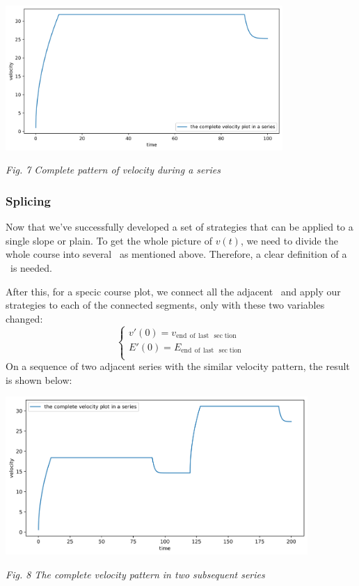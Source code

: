 \documentclass{article}
\begin{document}
\begin{itemize}
\begin{itemize}
							\begin{center}
								\includegraphics[height=5.5cm]{complete velocity pattern.png}

								\small\textit{Fig. 7 Complete pattern of velocity during a series}
							\end{center}

					\end{itemize}

			\end{itemize}
		\subsubsection{Splicing}
			Now that we've successfully developed a set of strategies that can be applied to a single slope or plain. To get the whole picture of \(v(t)\), we need to divide the whole course into several  \ as mentioned above. Therefore, a clear definition of a \ is needed.

			After this, for a specic course plot, we connect all the adjacent  \ and apply our strategies to each of the connected segments, only with these two variables changed:
			$$
			\left\{ \begin{array}{c}
				v\prime\left( 0 \right) =v_{\mathrm{end}\:\:\mathrm{of}\:\:\mathrm{last}\:\:\sec\mathrm{tion}}\\
				E\prime\left( 0 \right) =E_{\mathrm{end}\:\:\mathrm{of}\:\:\mathrm{last}\:\:\sec\mathrm{tion}}\\
			\end{array} \right.
			$$
			On a sequence of two adjacent series with the similar velocity pattern, the result is shown below:
			\begin{center}
				\includegraphics[height=6cm]{the complete velocity pattern in two adjacent series.png}

				\small\textit{Fig. 8 The complete velocity pattern in two subsequent series}
			\end{center}
\end{document}
